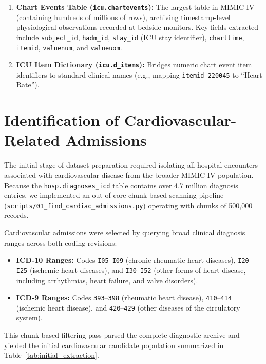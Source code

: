 \documentclass[12pt,a4paper,oneside]{report}
\begin{document}
\begin{enumerate}
    \item \textbf{Chart Events Table (\texttt{icu.chartevents}):} The largest table in MIMIC-IV (containing hundreds of millions of rows), archiving timestamp-level physiological observations recorded at bedside monitors. Key fields extracted include \texttt{subject\_id}, \texttt{hadm\_id}, \texttt{stay\_id} (ICU stay identifier), \texttt{charttime}, \texttt{itemid}, \texttt{valuenum}, and \texttt{valueuom}.
    
    \item \textbf{ICU Item Dictionary (\texttt{icu.d\_items}):} Bridges numeric chart event item identifiers to standard clinical names (e.g., mapping \texttt{itemid 220045} to ``Heart Rate'').
\end{enumerate}

\section{Identification of Cardiovascular-Related Admissions}
\label{sec:cardiac_admissions}

The initial stage of dataset preparation required isolating all hospital encounters associated with cardiovascular disease from the broader MIMIC-IV population. Because the \texttt{hosp.diagnoses\_icd} table contains over 4.7 million diagnosis entries, we implemented an out-of-core chunk-based scanning pipeline (\texttt{scripts/01\_find\_cardiac\_admissions.py}) operating with chunks of 500,000 records.

Cardiovascular admissions were selected by querying broad clinical diagnosis ranges across both coding revisions:
\begin{itemize}
    \item \textbf{ICD-10 Ranges:} Codes \texttt{I05}--\texttt{I09} (chronic rheumatic heart diseases), \texttt{I20}--\texttt{I25} (ischemic heart diseases), and \texttt{I30}--\texttt{I52} (other forms of heart disease, including arrhythmias, heart failure, and valve disorders).
    \item \textbf{ICD-9 Ranges:} Codes \texttt{393}--\texttt{398} (rheumatic heart disease), \texttt{410}--\texttt{414} (ischemic heart disease), and \texttt{420}--\texttt{429} (other diseases of the circulatory system).
\end{itemize}

This chunk-based filtering pass parsed the complete diagnostic archive and yielded the initial cardiovascular candidate population summarized in Table~\ref{tab:initial_extraction}.
\end{document}
